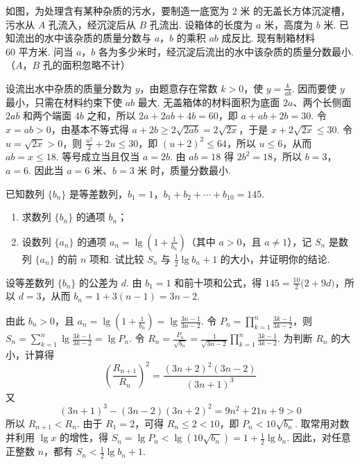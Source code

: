 \begin{problem}
如图，为处理含有某种杂质的污水，要制造一底宽为 \(2\text{ 米}\) 的无盖长方体沉淀槽，污水从 \(A\) 孔流入，经沉淀后从 \(B\) 孔流出. 设箱体的长度为 \(a\text{ 米}\)，高度为 \(b\text{ 米}\). 已知流出的水中该杂质的质量分数与 \(a\)，\(b\) 的乘积 \(ab\) 成反比. 现有制箱材料 \(60\text{ 平方米}\). 问当 \(a\)，\(b\) 各为多少米时，经沉淀后流出的水中该杂质的质量分数最小.（\(A\)，\(B\) 孔的面积忽略不计）

\end{problem}

\begin{solution}
设流出水中杂质的质量分数为 \(y\)，由题意存在常数 \(k>0\)，使 \(y=\frac{k}{ab}\). 因而要使 \(y\) 最小，只需在材料约束下使 \(ab\) 最大. 无盖箱体的材料面积为底面 \(2a\)、两个长侧面 \(2ab\) 和两个端面 \(4b\) 之和，所以 \(2a+2ab+4b=60\)，即 \(a+ab+2b=30\). 令 \(x=ab>0\)，由基本不等式得 \(a+2b\geqslant2\sqrt{2ab}=2\sqrt{2x}\)，于是 \(x+2\sqrt{2x}\leqslant30\). 令 \(u=\sqrt{2x}>0\)，则 \(\frac{u^2}{2}+2u\leqslant30\)，即 \((u+2)^2\leqslant64\)，所以 \(u\leqslant6\)，从而 \(ab=x\leqslant18\). 等号成立当且仅当 \(a=2b\). 由 \(ab=18\) 得 \(2b^2=18\)，所以 \(b=3\)，\(a=6\). 因此当 \(a=6\text{ 米}\)、\(b=3\text{ 米}\) 时，质量分数最小.
\end{solution}

\begin{problem}
已知数列 \(\{b_{n}\}\) 是等差数列，\(b_{1} = 1\)，\(b_{1} + b_{2} + \cdots + b_{10} = 145\).

\begin{enumerate}
\item 求数列 \(\{b_{n}\}\) 的通项 \(b_n\)；
\item 设数列 \(\{a_{n}\}\) 的通项 \(a_n = \lg\left(1 + \frac{1}{b_n}\right)\)（其中 \(a > 0\)，且 \(a \neq 1\)），记 \(S_n\) 是数列 \(\{a_n\}\) 的前 \(n\) 项和. 试比较 \(S_n\) 与 \(\frac{1}{2}\lg b_n + 1\) 的大小，并证明你的结论.
\end{enumerate}
\end{problem}

\begin{solution}
设等差数列 \(\{b_n\}\) 的公差为 \(d\). 由 \(b_1=1\) 和前十项和公式，得 \(145=\frac{10}{2}\bigl(2+9d\bigr)\)，所以 \(d=3\)，从而 \(b_n=1+3(n-1)=3n-2\).

由此 \(b_n>0\)，且 \(a_n=\lg\left(1+\frac{1}{b_n}\right)=\lg\frac{3n-1}{3n-2}\). 令
\(P_n=\prod_{k=1}^{n}\frac{3k-1}{3k-2}\)，则
\(S_n=\sum_{k=1}^{n}\lg\frac{3k-1}{3k-2}=\lg P_n\). 令
\(R_n=\frac{P_n}{\sqrt{b_n}}=\frac{1}{\sqrt{3n-2}}\prod_{k=1}^{n}\frac{3k-1}{3k-2}\).
为判断 \(R_n\) 的大小，计算得
\[
\left(\frac{R_{n+1}}{R_n}\right)^2
=\frac{(3n+2)^2(3n-2)}{(3n+1)^3}
\]
又
\[
(3n+1)^3-(3n-2)(3n+2)^2=9n^2+21n+9>0
\]
所以 \(R_{n+1}<R_n\). 由于 \(R_1=2\)，可得 \(R_n\leqslant2<10\)，即
\(P_n<10\sqrt{b_n}\). 取常用对数并利用 \(\lg x\) 的增性，得
\(S_n=\lg P_n<\lg\left(10\sqrt{b_n}\right)=1+\frac{1}{2}\lg b_n\).
因此，对任意正整数 \(n\)，都有 \(S_n<\frac{1}{2}\lg b_n+1\).
\end{solution}
